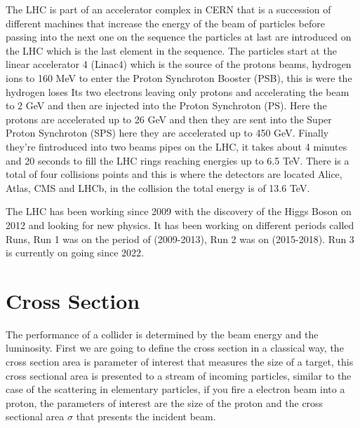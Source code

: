The LHC is part of an accelerator complex in CERN that is a succession of different machines that increase the energy of the beam of particles before passing into the next one on the sequence the particles at last are introduced on the LHC which is the last element in the sequence. The particles start at the linear accelerator 4 (Linac4) which is the source of the protons beams, hydrogen ions to 160 MeV to enter the Proton Synchroton Booster (PSB), this is were the hydrogen loses Its two electrons leaving only protons and accelerating the beam to 2 GeV  and then are injected into the Proton Synchroton (PS). Here the protons are accelerated up to 26 GeV and then they are sent into the Super Proton Synchroton (SPS) here they are accelerated up to 450 GeV. Finally they're fintroduced into two beams pipes on the LHC, it takes about 4 minutes and 20 seconds to fill the LHC rings reaching energies up to 6.5 TeV. There is a total of four collisions points and this is where the detectors are located Alice, Atlas, CMS and LHCb, in the collision the total energy is of 13.6 TeV. \cite{LHCII}

The LHC has been working since 2009 with the discovery of the Higgs Boson on 2012 and looking for new physics. It has been working on different periods called Runs, Run 1 was on the period of (2009-2013), Run 2 was on (2015-2018). Run 3 is currently on going since 2022. 

\section{Cross Section}


The performance of a collider is determined by the beam energy and the luminosity. First we are going to define the cross section in a classical way, the cross section area is parameter of interest that measures the size of a target, this cross sectional area is presented to a stream of incoming particles, similar to the case of the scattering in elementary particles, if you fire a electron beam into a proton, the parameters of interest are the size of the proton and the cross sectional area $\sigma$ that presents the incident beam. 

